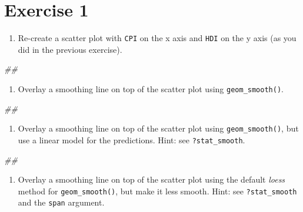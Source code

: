 \documentclass[]{book}
\newenvironment{Shaded}{\begin{snugshade}}{\end{snugshade}}
\newcommand{\CommentTok}[1]{\textcolor[rgb]{0.56,0.35,0.01}{\textit{#1}}}
\providecommand{\tightlist}{%
  \setlength{\itemsep}{0pt}\setlength{\parskip}{0pt}}
\begin{document}
\hypertarget{exercise-1-2}{%
\section{Exercise 1}\label{exercise-1-2}}

\begin{enumerate}
\def\labelenumi{\arabic{enumi}.}
\tightlist
\item
  Re-create a scatter plot with \texttt{CPI} on the x axis and \texttt{HDI} on the y axis (as you did in the previous exercise).
\end{enumerate}

\begin{Shaded}
\begin{Highlighting}[]
\CommentTok{## }
\end{Highlighting}
\end{Shaded}

\begin{enumerate}
\def\labelenumi{\arabic{enumi}.}
\setcounter{enumi}{1}
\tightlist
\item
  Overlay a smoothing line on top of the scatter plot using \texttt{geom\_smooth()}.
\end{enumerate}

\begin{Shaded}
\begin{Highlighting}[]
\CommentTok{## }
\end{Highlighting}
\end{Shaded}

\begin{enumerate}
\def\labelenumi{\arabic{enumi}.}
\setcounter{enumi}{2}
\tightlist
\item
  Overlay a smoothing line on top of the scatter plot using \texttt{geom\_smooth()}, but use a linear model for the predictions. Hint: see \texttt{?stat\_smooth}.
\end{enumerate}

\begin{Shaded}
\begin{Highlighting}[]
\CommentTok{## }
\end{Highlighting}
\end{Shaded}

\begin{enumerate}
\def\labelenumi{\arabic{enumi}.}
\setcounter{enumi}{3}
\tightlist
\item
  Overlay a smoothing line on top of the scatter plot using the default \emph{loess} method for \texttt{geom\_smooth()}, but make it less smooth. Hint: see \texttt{?stat\_smooth} and the \texttt{span} argument.
\end{enumerate}
\end{document}
